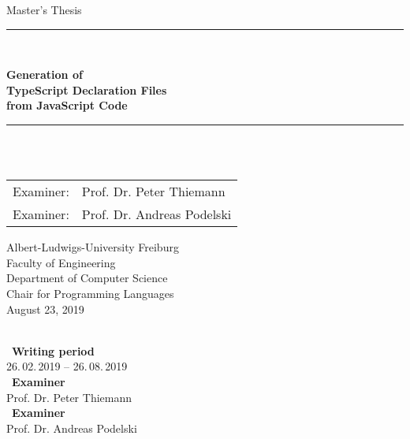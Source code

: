 
\begin{titlepage}
\begin{center}

\newcommand{\HorizontalLine}{\rule{\linewidth}{0.3mm}}

{\Large Master's Thesis}\\[1.3cm]


\HorizontalLine \\[0.4cm]
\begin{spacing}{3}
    {\huge \bfseries Generation of } \\
    {\huge \bfseries TypeScript Declaration Files} \\
    {\huge \bfseries from JavaScript Code}\\
\end{spacing}
\HorizontalLine \\[1.5cm]


{\Huge \theauthor} \\[2cm]


\begin{tabular}[hc]{>{\huge}l >{\huge}l}
  Examiner: & Prof. Dr. Peter Thiemann \\[0.3cm]
  Examiner: & Prof. Dr. Andreas Podelski \\[1.2cm]
\end{tabular}
\vfill  %

\Large {
    Albert-Ludwigs-University Freiburg\\
    Faculty of Engineering\\
    Department of Computer Science\\
    Chair for Programming Languages\\[1cm]

    August 23, 2019\\
}
\end{center}
\end{titlepage}

\thispagestyle{empty}
\ \vfill \ \\  %
\
\textbf{Writing period}            \smallskip{} \\
26.\,02.\,2019 -- 26.\,08.\,2019   \bigskip{} \\
\
\textbf{Examiner}                  \smallskip{} \\
Prof. Dr. Peter Thiemann              \bigskip{} \\
\
\textbf{Examiner}                  \smallskip{} \\
Prof. Dr. Andreas Podelski
